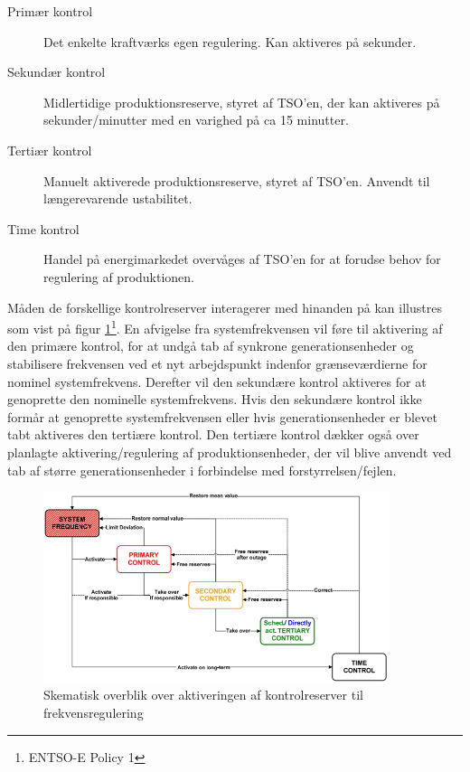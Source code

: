 \begin{description}
	\item[Primær kontrol] Det enkelte kraftværks egen regulering. Kan aktiveres på sekunder.
	\item[Sekundær kontrol] Midlertidige produktionsreserve, styret af TSO'en, der kan aktiveres på sekunder/minutter med en varighed på ca 15 minutter.
	\item[Tertiær kontrol] Manuelt aktiverede produktionsreserve, styret af TSO'en. Anvendt til længerevarende ustabilitet.
	\item[Time kontrol] Handel på energimarkedet overvåges af TSO'en for at forudse behov for regulering af produktionen.
\end{description}

Måden de forskellige kontrolreserver interagerer med hinanden på kan illustres som vist på figur \ref{fig:Frekvenskontrol}\footnote{ENTSO-E Policy 1}. En afvigelse fra systemfrekvensen vil føre til aktivering af den primære kontrol, for at undgå tab af synkrone generationsenheder og stabilisere frekvensen ved et nyt arbejdspunkt indenfor grænseværdierne for nominel systemfrekvens. Derefter vil den sekundære kontrol aktiveres for at genoprette den nominelle systemfrekvens. Hvis den sekundære kontrol ikke formår at genoprette systemfrekvensen eller hvis generationsenheder er blevet tabt aktiveres den tertiære kontrol. Den tertiære kontrol dækker også over planlagte aktivering/regulering af produktionsenheder, der vil blive anvendt ved tab af større generationsenheder i forbindelse med forstyrrelsen/fejlen.

\begin{figure}[H] %
	\centering
	\includegraphics[width=0.9\textwidth]{figurer/Frekvenskontrol}
	\caption{Skematisk overblik over aktiveringen af kontrolreserver til frekvensregulering}
	\label{fig:Frekvenskontrol}
\end{figure}

